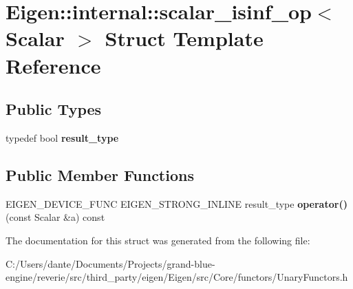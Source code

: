\hypertarget{struct_eigen_1_1internal_1_1scalar__isinf__op}{}\section{Eigen\+::internal\+::scalar\+\_\+isinf\+\_\+op$<$ Scalar $>$ Struct Template Reference}
\label{struct_eigen_1_1internal_1_1scalar__isinf__op}
\subsection*{Public Types}
\begin{DoxyCompactItemize}
\item 
\mbox{\label{struct_eigen_1_1internal_1_1scalar__isinf__op_afe7b3b55a9667996d27738122ae6c2f7}} 
typedef bool {\bfseries result\+\_\+type}
\end{DoxyCompactItemize}
\subsection*{Public Member Functions}
\begin{DoxyCompactItemize}
\item 
\mbox{\label{struct_eigen_1_1internal_1_1scalar__isinf__op_a78f82f9ed7153199e9daea1c6a78bb2e}} 
E\+I\+G\+E\+N\+\_\+\+D\+E\+V\+I\+C\+E\+\_\+\+F\+U\+NC E\+I\+G\+E\+N\+\_\+\+S\+T\+R\+O\+N\+G\+\_\+\+I\+N\+L\+I\+NE result\+\_\+type {\bfseries operator()} (const Scalar \&a) const
\end{DoxyCompactItemize}


The documentation for this struct was generated from the following file\+:\begin{DoxyCompactItemize}
\item 
C\+:/\+Users/dante/\+Documents/\+Projects/grand-\/blue-\/engine/reverie/src/third\+\_\+party/eigen/\+Eigen/src/\+Core/functors/Unary\+Functors.\+h\end{DoxyCompactItemize}
